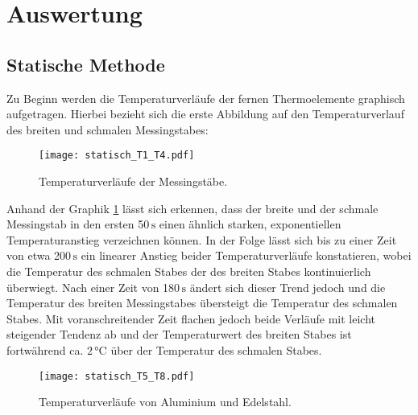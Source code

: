 %

%
\section{Auswertung}
\label{sec:Auswertung}

\subsection{Statische Methode}
\label{sec:Statische Methode}

Zu Beginn werden die Temperaturverläufe der fernen Thermoelemente graphisch aufgetragen. Hierbei bezieht sich die erste Abbildung
auf den Temperaturverlauf des breiten und schmalen Messingstabes:

\begin{figure}[H]
  \centering
  \texttt{[image: statisch\_T1\_T4.pdf]}
  \caption{Temperaturverläufe der Messingstäbe.}
  \label{fig:statisch1}
\end{figure}

Anhand der Graphik \ref{fig:statisch1} lässt sich erkennen, dass der breite und der schmale Messingstab in den ersten 50\,$\unit{\second}$
einen ähnlich starken, exponentiellen Temperaturanstieg verzeichnen können. In der Folge lässt sich bis zu einer Zeit von etwa 
200\,$\unit{\second}$ ein linearer Anstieg beider Temperaturverläufe konstatieren, wobei die Temperatur des schmalen Stabes der 
des breiten Stabes kontinuierlich überwiegt. Nach einer Zeit von 180\,$\unit{\second}$ ändert sich dieser Trend jedoch und die
Temperatur des breiten Messingstabes übersteigt die Temperatur des schmalen Stabes. Mit voranschreitender Zeit flachen jedoch beide
Verläufe mit leicht steigender Tendenz ab und der Temperaturwert des breiten Stabes ist fortwährend ca. $2\,\unit{\celsius}$ über der Temperatur des schmalen Stabes.
\newpage

\begin{figure}[H]
  \centering
  \texttt{[image: statisch\_T5\_T8.pdf]}
  \caption{Temperaturverläufe von Aluminium und Edelstahl.}
  \label{fig:statisch2}
\end{figure}

